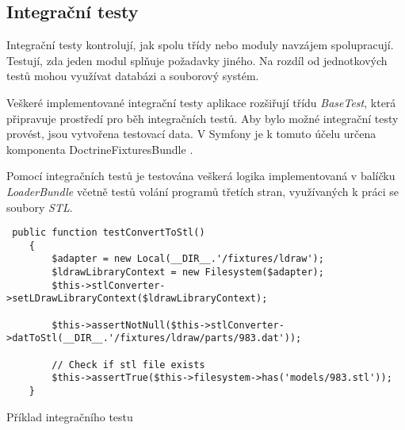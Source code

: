 \subsection{Integrační testy}
Integrační testy kontrolují, jak spolu třídy nebo moduly navzájem spolupracují. Testují, zda jeden modul splňuje požadavky jiného. Na rozdíl od jednotkových testů mohou využívat databázi a  souborový systém. \autocite{zdrojak:testy}

Veškeré implementované integrační testy aplikace rozšiřují třídu \textit{BaseTest}, která připravuje prostředí pro běh integračních testů. Aby bylo možné integrační testy provést, jsou vytvořena testovací data. V Symfony je k tomuto účelu určena komponenta DoctrineFixturesBundle \autocite{doctrine:fixtures}. 

Pomocí integračních testů je testována veškerá logika implementovaná v balíčku \textit{LoaderBundle} včetně testů volání programů třetích stran, využívaných k práci se soubory \textit{STL}.

\begin{listing}[htbp]
        \begin{verbatim}
 public function testConvertToStl()
    {
        $adapter = new Local(__DIR__.'/fixtures/ldraw');
        $ldrawLibraryContext = new Filesystem($adapter);
        $this->stlConverter->setLDrawLibraryContext($ldrawLibraryContext);

        $this->assertNotNull($this->stlConverter->datToStl(__DIR__.'/fixtures/ldraw/parts/983.dat'));
        
        // Check if stl file exists
        $this->assertTrue($this->filesystem->has('models/983.stl'));
    }
         \end{verbatim}
    \caption{Příklad integračního testu \label{phpunit-integracni}}
\end{listing}
